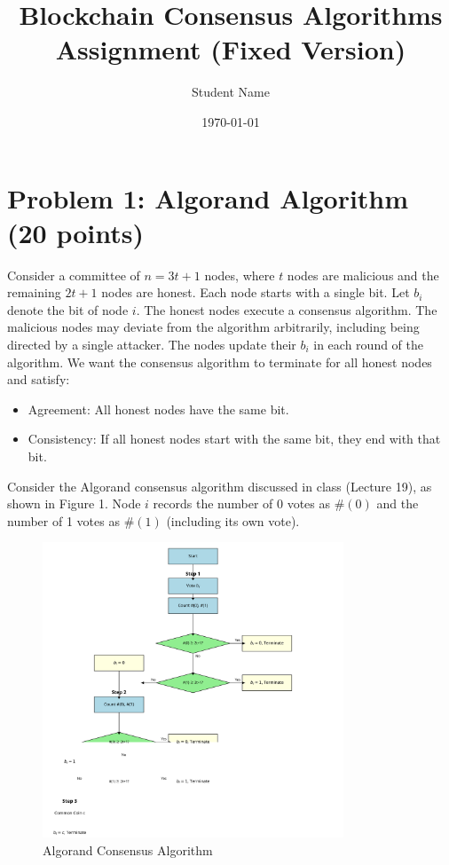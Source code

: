 \documentclass[12pt,a4paper]{article}
\title{Blockchain Consensus Algorithms Assignment (Fixed Version)}
\author{Student Name}
\date{\today}
\begin{document}
\maketitle

\section{Problem 1: Algorand Algorithm (20 points)}

Consider a committee of $n = 3t + 1$ nodes, where $t$ nodes are malicious and the remaining $2t + 1$ nodes are honest. Each node starts with a single bit. Let $b_i$ denote the bit of node $i$. The honest nodes execute a consensus algorithm. The malicious nodes may deviate from the algorithm arbitrarily, including being directed by a single attacker. The nodes update their $b_i$ in each round of the algorithm. We want the consensus algorithm to terminate for all honest nodes and satisfy:

\begin{itemize}
    \item Agreement: All honest nodes have the same bit.
    \item Consistency: If all honest nodes start with the same bit, they end with that bit.
\end{itemize}

Consider the Algorand consensus algorithm discussed in class (Lecture 19), as shown in Figure 1. Node $i$ records the number of 0 votes as $\#(0)$ and the number of 1 votes as $\#(1)$ (including its own vote).

\begin{figure}[h]
    \centering
    \includegraphics[width=0.8\textwidth]{images/algorand_algorithm_fixed.png}
    \caption{Algorand Consensus Algorithm}
\end{figure}
\end{document}
